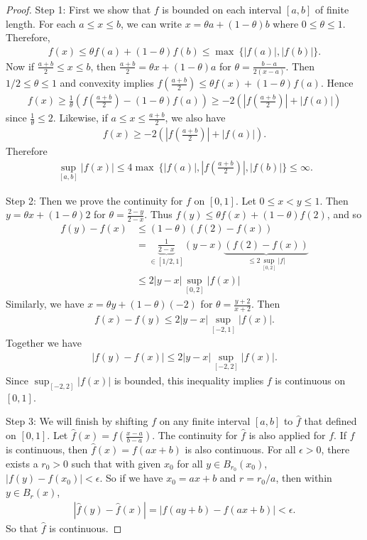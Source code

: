 \begin{proof}
Step 1:
First we show that $f$ is bounded on each interval $[a, b]$ of finite length.
For each $a \le x \le b$, we can write $x = \theta a + (1-\theta) b$ where $0 \le \theta \le 1$.
Therefore,
\begin{align}
f(x) \le \theta f(a) + (1-\theta) f(b) \le \max \ \{ 
|f(a)|, |f(b)| \}.
\end{align}
Now if $\frac{a+b}{2} \le x \le b$, then $\frac{a+b}{2} = \theta x + (1-\theta) a$ for $\theta = \frac{b-a}{2(x-a)}$.
Then $1/2 \le \theta \le 1$ and convexity implies $f(\frac{a+b}{2}) \le \theta f(x) + (1-\theta) f(a)$.
Hence
\begin{align}
f(x) \ge \frac{1}{\theta} \left( f(\frac{a+b}{2}) - (1-\theta) f(a) \right) \ge -2 \left( |f(\frac{a+b}{2})| + |f(a)| \right)
\end{align}
since $\frac{1}{\theta} \le 2$.
Likewise, if $a \le x \le \frac{a+b}{2}$, we also have
\begin{align}
f(x) \ge -2 \left( |f(\frac{a+b}{2})| + |f(a)| \right).
\end{align}
Therefore
\begin{align}
\sup_{[a, b]} |f(x)| \le 4 \max \ \{ |f(a)|, |f(\frac{a+b}{2})|, |f(b)| \} \le \infty.
\end{align}

Step 2:
Then we prove the continuity for $f$ on $[0, 1]$.
Let $0 \le x < y \le 1$.
Then $y = \theta x + (1-\theta) 2$ for $\theta = \frac{2-y}{2-x}$.
Thus $f(y) \le \theta f(x) + (1-\theta) f(2)$, and so
\begin{align}
f(y) - f(x) & \le (1-\theta)(f(2) -f(x)) \\
& = \underbrace{\frac{1}{2-x}}_{\in [1/2, 1]} (y-x) \underbrace{(f(2) - f(x))}_{\le 2 \sup_{[0, 2]} |f|} \\
& \le 2 |y-x| \sup _{[0, 2]} |f(x)|
\end{align}
Similarly, we have $x = \theta y + (1-\theta) (-2)$ for $\theta = \frac{y+2}{x+2}$.
Then
\begin{align}
f(x) - f(y) \le 2 |y-x| \sup _{[-2, 1]} |f(x)|.
\end{align}
Together we have
\begin{align}
|f(y) - f(x)| \le 2 |y-x| \sup _{[-2, 2]} |f(x)|.
\end{align}
Since $\sup _{[-2, 2]} |f(x)|$ is bounded, this inequality implies $f$ is continuous on $[0, 1]$.

Step 3:
We will finish by shifting $f$ on any finite interval $[a, b]$ to $\hat{f}$ that defined on $[0, 1]$.
Let $\hat{f}(x) = f(\frac{x-a}{b-a})$.
The continuity for $\hat{f}$ is also applied for $f$.
If $f$ is continuous, then $\hat{f}(x) = f(ax + b)$ is also continuous.
For all $\epsilon > 0$, there exists a $r_0 > 0$ such that with given $x_0$ for all $y \in B_{r_0}(x_0)$, $|f(y) - f(x_0)| < \epsilon$.
So if we have $x_0 = a x + b$ and $r = r_0 / a$, then within $y \in B_r(x)$, 
\begin{align}
|\hat{f}(y) -\hat{f}(x)| = |f(a y+b) - f(a x+b)| < \epsilon.
\end{align}
So that $\hat{f}$ is continuous.
\end{proof}

